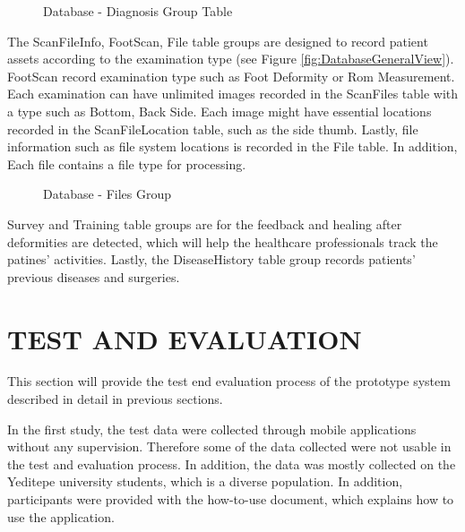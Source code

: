 \begin{figure}[htbp]
\centering
{}
\caption{Database - Diagnosis Group Table}
\label{fig:DatabaseDiagnosis}
\end{figure}

The ScanFileInfo, FootScan, File table groups are designed to record patient assets according to the examination type (see Figure \ref{fig:DatabaseGeneralView}). FootScan record examination type such as Foot Deformity or Rom Measurement. Each examination can have unlimited images recorded in the ScanFiles table with a type such as Bottom, Back Side. Each image might have essential locations recorded in the ScanFileLocation table, such as the side thumb. Lastly, file information such as file system locations is recorded in the File table. In addition, Each file contains a file type for processing. 

\begin{figure}[htbp]
\centering
{}
\caption{Database - Files Group}
\label{fig:DatabaseFiles}
\end{figure}

Survey and Training table groups are for the feedback and healing after deformities are detected, which will help the healthcare professionals track the patines' activities. Lastly, the DiseaseHistory table group records patients' previous diseases and surgeries. 

\section{TEST AND EVALUATION} \label{sec:StudyITestAndEvaluation}

This section will provide the test end evaluation process of the prototype system described in detail in previous sections. 

In the first study, the test data were collected through mobile applications without any supervision. Therefore some of the data collected were not usable in the test and evaluation process. In addition, the data was mostly collected on the Yeditepe university students, which is a diverse population. In addition, participants were provided with the how-to-use document, which explains how to use the application. 

